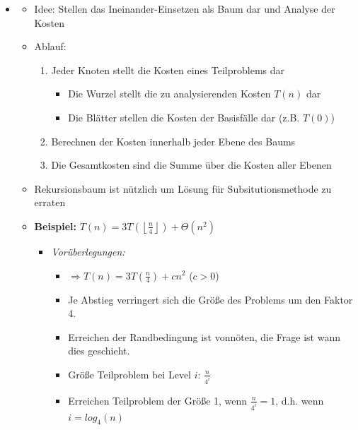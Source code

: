 \documentclass[
    ngerman,
    color=3b,
    load_common, %
    summary,
    boxarc,
]{tuda_summary}
\begin{document}
\begin{itemize}
    \item {}
          \begin{itemize}
              \item Idee: Stellen das Ineinander-Einsetzen als Baum dar und Analyse der Kosten
              \item Ablauf:
                    \begin{enumerate}
                        \item Jeder Knoten stellt die Kosten eines Teilproblems dar
                              \begin{itemize}
                                  \item Die Wurzel stellt die zu analysierenden Kosten $T(n)$ dar
                                  \item Die Blätter stellen die Kosten der Basisfälle dar (z.B. $T(0)$)
                              \end{itemize}
                        \item Berechnen der Kosten innerhalb jeder Ebene des Baums
                        \item Die Gesamtkosten sind die Summe über die Kosten aller Ebenen
                    \end{enumerate}
              \item Rekursionsbaum ist nützlich um Lösung für Subsitutionsmethode zu erraten
                    \clearpage
              \item \textbf{Beispiel:} $T(n) = 3T(\left \lfloor \frac{n}{4} \right \rfloor) + \Theta(n^2)$
                    \begin{itemize}
                        \item \textit{Vorüberlegungen:}
                              \begin{itemize}
                                  \item $\Rightarrow T(n) = 3T(\frac{n}{4}) + cn^2$ ($c>0$)
                                  \item Je Abstieg verringert sich die Größe des Problems um den Faktor 4.
                                  \item Erreichen der Randbedingung ist vonnöten, die Frage ist wann dies geschieht.
                                  \item Größe Teilproblem bei Level $i$: $\frac{n}{4^i}$
                                  \item Erreichen Teilproblem der Größe 1, wenn $\frac{n}{4^i}=1$, d.h. wenn $i=log_4(n)$ \\

\end{itemize}
\end{itemize}
\end{itemize}
\end{itemize}
\end{document}
